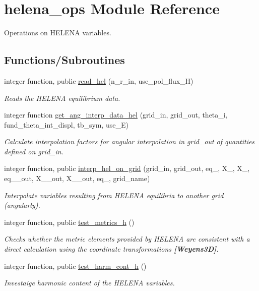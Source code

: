 \hypertarget{namespacehelena__ops}{}\section{helena\+\_\+ops Module Reference}
\label{namespacehelena__ops}


Operations on H\+E\+L\+E\+NA variables.  


\subsection*{Functions/\+Subroutines}
\begin{DoxyCompactItemize}
\item 
integer function, public \hyperlink{namespacehelena__ops_ae05ba1182eb002d93c27ca4ff7ab8cf2}{read\+\_\+hel} (n\+\_\+r\+\_\+in, use\+\_\+pol\+\_\+flux\+\_\+H)
\begin{DoxyCompactList}\small\item\em Reads the H\+E\+L\+E\+NA equilibrium data. \end{DoxyCompactList}\item 
integer function \hyperlink{namespacehelena__ops_ab1329afe5af2ff92d96f4be15a096b38}{get\+\_\+ang\+\_\+interp\+\_\+data\+\_\+hel} (grid\+\_\+in, grid\+\_\+out, theta\+\_\+i, fund\+\_\+theta\+\_\+int\+\_\+displ, tb\+\_\+sym, use\+\_\+E)
\begin{DoxyCompactList}\small\item\em Calculate interpolation factors for angular interpolation in {\ttfamily grid\+\_\+out} of quantities defined on {\ttfamily grid\+\_\+in}. \end{DoxyCompactList}\item 
integer function, public \hyperlink{namespacehelena__ops_a7796861de18ae7ac9c3aa07a8628be38}{interp\+\_\+hel\+\_\+on\+\_\+grid} (grid\+\_\+in, grid\+\_\+out, eq\+\_, X\+\_, X\+\_, eq\+\_\+\_\+out, X\+\_\+\_\+out, X\+\_\+\_\+out, eq\+\_, grid\+\_\+name)
\begin{DoxyCompactList}\small\item\em Interpolate variables resulting from H\+E\+L\+E\+NA equilibria to another grid (angularly). \end{DoxyCompactList}\item 
integer function, public \hyperlink{namespacehelena__ops_a0f156b3653264fb016d6d311eb59114c}{test\+\_\+metrics\+\_\+h} ()
\begin{DoxyCompactList}\small\item\em Checks whether the metric elements provided by H\+E\+L\+E\+NA are consistent with a direct calculation using the coordinate transformations {\bfseries [Weyens3D]}. \end{DoxyCompactList}\item 
integer function, public \hyperlink{namespacehelena__ops_a83f2ad5dc967c7bae287b60fddb8eb0a}{test\+\_\+harm\+\_\+cont\+\_\+h} ()
\begin{DoxyCompactList}\small\item\em Investaige harmonic content of the H\+E\+L\+E\+NA variables. \end{DoxyCompactList}\end{DoxyCompactItemize}


